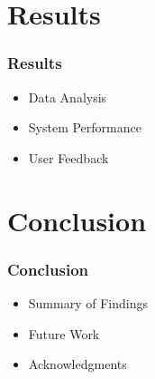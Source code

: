 \documentclass{beamer}
\begin{document}
\section{Results}
\begin{frame}
    \frametitle{Results}
    \begin{itemize}
        \item Data Analysis
        \item System Performance
        \item User Feedback
    \end{itemize}
\end{frame}

\section{Conclusion}
\begin{frame}
    \frametitle{Conclusion}
    \begin{itemize}
        \item Summary of Findings
        \item Future Work
        \item Acknowledgments
    \end{itemize}
\end{frame}

\end{document}
